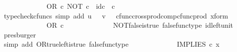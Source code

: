 \begin{isabellebody}
\ \ \ \ \ \ \ \ \isamarkupfalse%
\ \isamarkupfalse%
\ {\isachardoublequoteopen}{\isachardot}{\kern0pt}{\isachardot}{\kern0pt}{\isachardot}{\kern0pt}\ {\isacharequal}{\kern0pt}\ OR\ {\isasymcirc}\isactrlsub c\ {\isasymlangle}NOT\ {\isasymcirc}\isactrlsub c\ {\isasymf}{\isacharcomma}{\kern0pt}\ id\isactrlsub c\ {\isasymOmega}\ {\isasymcirc}\isactrlsub c\ {\isasymf}{\isasymrangle}{\isachardoublequoteclose}\isanewline
\ \ \ \ \ \ \ \ \ \ \isamarkupfalse%
\ {\isacharparenleft}{\kern0pt}typecheck{\isacharunderscore}{\kern0pt}cfuncs{\isacharcomma}{\kern0pt}\ simp\ add{\isacharcolon}{\kern0pt}\ {\isacartoucheopen}u\ {\isacharequal}{\kern0pt}\ {\isasymf}{\isacartoucheclose}\ {\isacartoucheopen}v\ {\isacharequal}{\kern0pt}\ {\isasymf}{\isacartoucheclose}\ cfunc{\isacharunderscore}{\kern0pt}cross{\isacharunderscore}{\kern0pt}prod{\isacharunderscore}{\kern0pt}comp{\isacharunderscore}{\kern0pt}cfunc{\isacharunderscore}{\kern0pt}prod\ x{\isacharunderscore}{\kern0pt}form{\isacharparenright}{\kern0pt}\isanewline
\ \ \ \ \ \ \ \ \isamarkupfalse%
\ \isamarkupfalse%
\ {\isachardoublequoteopen}{\isachardot}{\kern0pt}{\isachardot}{\kern0pt}{\isachardot}{\kern0pt}\ {\isacharequal}{\kern0pt}\ OR\ {\isasymcirc}\isactrlsub c\ {\isasymlangle}{\isasymt}{\isacharcomma}{\kern0pt}\ {\isasymf}{\isasymrangle}{\isachardoublequoteclose}\isanewline
\ \ \ \ \ \ \ \ \ \ \isamarkupfalse%
\ NOT{\isacharunderscore}{\kern0pt}false{\isacharunderscore}{\kern0pt}is{\isacharunderscore}{\kern0pt}true\ false{\isacharunderscore}{\kern0pt}func{\isacharunderscore}{\kern0pt}type\ id{\isacharunderscore}{\kern0pt}left{\isacharunderscore}{\kern0pt}unit{}\ \isamarkupfalse%
\ presburger\isanewline
\ \ \ \ \ \ \ \ \isamarkupfalse%
\ \isamarkupfalse%
\ {\isachardoublequoteopen}{\isachardot}{\kern0pt}{\isachardot}{\kern0pt}{\isachardot}{\kern0pt}\ {\isacharequal}{\kern0pt}\ {\isasymt}{\isachardoublequoteclose}\isanewline
\ \ \ \ \ \ \ \ \ \ \isamarkupfalse%
\ {\isacharparenleft}{\kern0pt}simp\ add{\isacharcolon}{\kern0pt}\ OR{\isacharunderscore}{\kern0pt}true{\isacharunderscore}{\kern0pt}left{\isacharunderscore}{\kern0pt}is{\isacharunderscore}{\kern0pt}true\ false{\isacharunderscore}{\kern0pt}func{\isacharunderscore}{\kern0pt}type{\isacharparenright}{\kern0pt}\isanewline
\ \ \ \ \ \ \ \ \isamarkupfalse%
\ \isamarkupfalse%
\ {\isachardoublequoteopen}{\isachardot}{\kern0pt}{\isachardot}{\kern0pt}{\isachardot}{\kern0pt}\ {\isacharequal}{\kern0pt}\ IMPLIES\ {\isasymcirc}\isactrlsub c\ x{\isachardoublequoteclose}\isanewline

\end{isabellebody}
